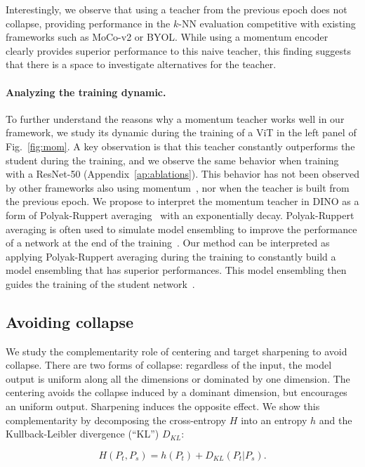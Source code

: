 Interestingly, we observe that using a teacher from the previous epoch does not collapse, providing performance in the $k$-NN evaluation competitive with existing frameworks such as MoCo-v2 or BYOL. While using a momentum encoder clearly provides superior performance to this naive teacher, this finding suggests that there is a space to investigate alternatives for the teacher.

\paragraph{Analyzing the training dynamic.} To further understand the reasons why a momentum teacher works well in our framework, we study its dynamic during the training of a ViT in the left panel of Fig.~\ref{fig:mom}.
A key observation is that this teacher constantly outperforms the student during the training, and we observe the same behavior when training with a ResNet-50 (Appendix~\ref{ap:ablations}).
This behavior has not been observed by other frameworks also using momentum~\cite{he2020momentum,grill2020bootstrap}, nor when the teacher is built from the previous epoch. We propose to interpret the momentum teacher in DINO as a form of Polyak-Ruppert averaging~\cite{polyak1992acceleration, ruppert1988efficient} with an exponentially decay. Polyak-Ruppert averaging is often used to simulate model ensembling to improve the performance of a network at the end of the training~\cite{jean2014using}. Our method can be interpreted as applying Polyak-Ruppert averaging during the training to constantly build a model ensembling that has superior performances. This model ensembling then guides the training of the student network~\cite{tarvainen2017mean}. 

\subsection{Avoiding collapse}
\label{sec:collapse}

We study the complementarity role of centering and target sharpening to avoid collapse. There are two forms of collapse: regardless of the input, the model output is uniform along all the dimensions or dominated by one dimension. The centering avoids the collapse induced by a dominant dimension, but encourages an uniform output. Sharpening induces the opposite effect. We show this complementarity by decomposing the cross-entropy $H$ into an entropy $h$ and the Kullback-Leibler divergence (``KL'') $D_{KL}$:

\begin{equation}
  H(P_t, P_s) = h(P_t) + D_{KL}(P_t | P_s).
\end{equation}


